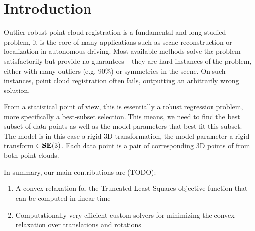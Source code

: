 \section{Introduction}
\label{sec:intro}

Outlier-robust point cloud registration is a fundamental and long-studied problem, it is the core of many applications such as scene reconstruction or localization in autonomous driving. Most available methods solve the problem satisfactorily but provide no guarantees -- they are hard instances of the problem, either with many outliers (e.g. 90\%) or symmetries in the scene. On such instances, point cloud registration often fails, outputting an arbitrarily wrong solution.

From a statistical point of view, this is essentially a robust regression problem, more specifically a best-subset selection. This means, we need to find the best subset of data points as well as the model parameters that best fit this subset.
The model is in this case a rigid 3D-transformation, the model parameter a rigid transform $\in \mathbf{SE(\textrm{3})}$. Each data point is a pair of corresponding 3D points of from both point clouds.

In summary, our main contributions are (TODO): 
\begin{enumerate}
	\item A convex relaxation for the Truncated Least Squares objective function that can be computed in linear time
	\item Computationally very efficient custom solvers for minimizing the convex relaxation over translations and rotations
\end{enumerate}





